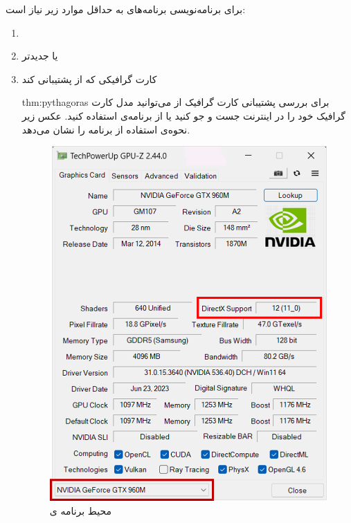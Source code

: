 {
    \Large
    برای برنامه‌نویسی برنامه‌های  به حداقل موارد زیر نیاز است:
    \begin{enumerate}
        \item {}
        \item { یا جدیدتر}
        \item {کارت گرافیکی که از  پشتیبانی کند
            \begin{theo}{thm:pythagoras}
                \Large
                برای بررسی پشتیبانی کارت گرافیک از  می‌توانید مدل کارت گرافیک خود را در اینترنت جست و جو کنید یا از برنامه‌ی  استفاده کنید. عکس زیر نحوه‌ی استفاده از برنامه را نشان می‌دهد.

                \begin{figure}[H]
                    \centering
                    \setlength{\belowcaptionskip}{-10pt}
                    \includegraphics[scale=0.50]{Images/3/3.Intro.0.1}
                    \caption*{\Large محیط برنامه ی  \textbf{\vspace{12pt}}}
                \end{figure}
            \end{theo}
        }
    \end{enumerate}
}

